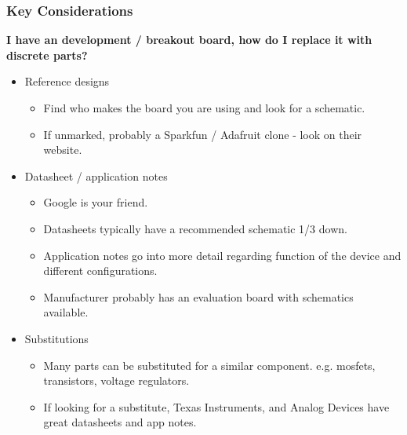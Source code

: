 \documentclass[t]{beamer}
\begin{document}
\begin{frame}
\frametitle{Key Considerations}
\large{\textbf{I have an development / breakout board, how do I replace it with discrete parts?}}
\vspace{1mm}
\begin{itemize}
	\item Reference designs 
	\begin{itemize}
		\item Find who makes the board you are using and look for a schematic.
		\item If unmarked, probably a Sparkfun / Adafruit clone - look on their website.
	\end{itemize} 
	\item Datasheet / application notes
	\begin{itemize}
		\item Google is your friend.
		\item Datasheets typically have a recommended schematic 1/3 down. 
		\item Application notes go into more detail regarding function of the device and different configurations. 
		\item Manufacturer probably has an evaluation board with schematics available.
	\end{itemize}
	\item Substitutions
	\begin{itemize}
		\item Many parts can be substituted for a similar component. e.g. mosfets, transistors, voltage regulators. 
		\item If looking for a substitute, Texas Instruments, and Analog Devices have great datasheets and app notes. 
	\end{itemize}
\end{itemize}
\end{frame}

\end{document}
